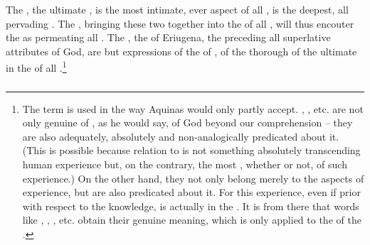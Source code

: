 \pa
The , the ultimate , is the most intimate, 
ever  aspect of all , is the deepest, all 
pervading . The \sch, bringing these two together into 
the  of all , will thus encouter the 
 as permeating all 
. The , the  of Eriugena, the  preceding all superlative 
attributes of God, are but expressions of 
the  of , of 
 the thorough 
 of the ultimate  in the  
of all .\footnote{The term 
 is used in
the way Aquinas would only partly accept.  ,
, etc. are not only genuine  of ,
as he would say, of God beyond our comprehension -- they are also
adequately, absolutely and non-analogically predicated about it.
(This is possible because   relation to  is
not something absolutely transcending human experience but, on the
contrary, the most , whether  or not,
 of such experience.) 
On the other hand, they not only belong merely  to
the aspects of  experience, but are also predicated
 about it.  For this experience, even if prior with
respect to the  knowledge, is actually  in
the . It is from there that words like , ,
, etc. obtain their genuine meaning, which is only 
 applied to the   of the
.}


\subsubsection{\yes}

